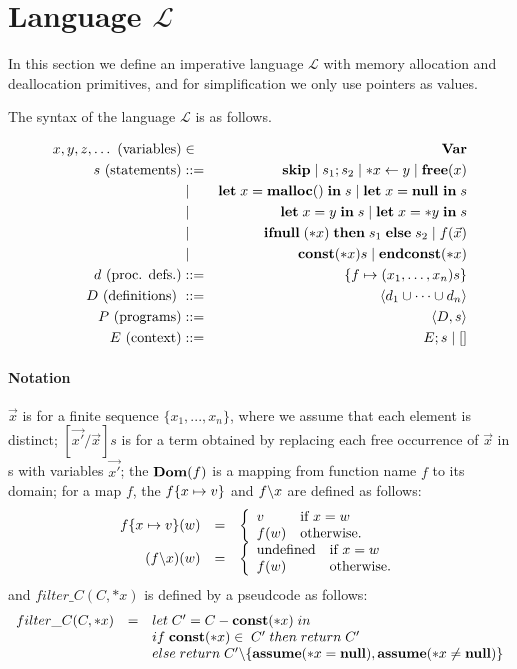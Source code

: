\section{Language \(\mathcal{L}\)}\label{sec:language}
In this section we define an imperative language \(\mathcal{L}\) with
memory allocation and deallocation primitives, and for simplification
we only use pointers as values.

The syntax of the language \(\mathcal{L}\) is as follows.

\begin{eqnarray*}
  x,y,z,\dots \mbox{ (variables)} &\in& \mathbf{Var}\\
  s \mbox{ (statements)} & ::= &  \mathbf{skip} \mid s_{1};s_{2} \mid *x \leftarrow y \mid \mathbf{free}(x) \\
  & \mid & \mathbf{let}\; x = \mathbf{malloc()}\; \mathbf{in}\; s \mid \mathbf{let}\; x = \mathbf{null}\ \mathbf{in}\; s  \\
  & \mid & \mathbf{let}\; x = y \; \mathbf{in}\; s \mid   \mathbf{let}\; x = *y \; \mathbf{in}\; s \\
  & \mid & \mathbf{ifnull}\;(*x) \; \mathbf{then}\; s_{1}\; \mathbf{else}\; s_{2} \mid f(\vec{x})\\
  & \mid & \mathbf{const}(*x) s \mid \mathbf{endconst}(*x)  \\
  d \mbox{ (proc. defs.)} & ::= & \{f \mapsto (x_1,\dots,x_n)s\}\\
  D \mbox{ (definitions) } &::=& \langle d_1 \cup \dots \cup d_n \rangle\\
  P \mbox{ (programs)} &::=& \langle D, s \rangle\\
  E \mbox{ (context)} &::=& E;s \mid [ ] 
\end{eqnarray*}

\paragraph{Notation} \(\vec{x}\) is for a finite sequence \(\{x_1,...,x_n\}\),
where we assume that each element is distinct; \([\vec{x'}/\vec{x}]s\)
is for a term obtained by replacing each free occurrence of
\(\vec{x}\) in s with variables \(\vec{x'}\); the \(\mathbf{Dom}(f)\) is a
mapping from function name \(f\) to its domain; for a map \(f\), the
\(f \{x \mapsto v\}\) and \( f \backslash x\) are defined as follows:
\[
\begin{array}{rcl}
f \{x \mapsto v\} (w) &=&
\left\{
\begin{array}{ll}
v & \mbox{if \(x = w\)}\\
f(w) & \mbox{otherwise.}
\end{array}
\right.\\
(f \backslash x)(w) &=&
\left\{
\begin{array}{ll}
\mbox{undefined} & \mbox{if \(x = w\)}\\
f(w) & \mbox{otherwise.}
\end{array}
\right.
\end{array}
\]
and \(filter\_C(C, *x)\) is defined by a pseudcode as follows:
\[
\begin{array}{lcl}
  filter\_C(C, *x) &=& let \; C' = C - \mathbf{const}(*x) \; in \\
  & & if \; \mathbf{const}(*x) \in \; C'\; then \; return \; C'\\
  & & else \; return \; C'\backslash\{\mathbf{assume}(*x = \mathbf{null}),\mathbf{assume}(*x \ne \mathbf{null})\}
\end{array}
\]


